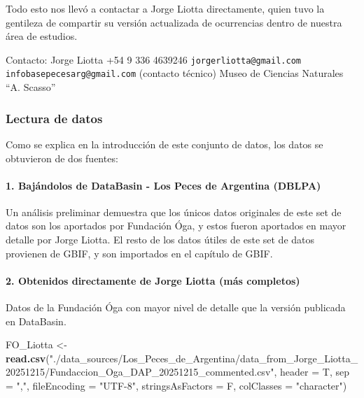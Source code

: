 \documentclass[sn-apa,pdflatex]{sn-jnl}
\newenvironment{Shaded}{\begin{snugshade}}{\end{snugshade}}
\newcommand{\AttributeTok}[1]{\textcolor[rgb]{0.13,0.29,0.53}{#1}}
\newcommand{\FunctionTok}[1]{\textcolor[rgb]{0.13,0.29,0.53}{\textbf{#1}}}
\newcommand{\NormalTok}[1]{#1}
\newcommand{\OtherTok}[1]{\textcolor[rgb]{0.56,0.35,0.01}{#1}}
\newcommand{\StringTok}[1]{\textcolor[rgb]{0.31,0.60,0.02}{#1}}
\begin{document}
Todo esto nos llevó a contactar a Jorge Liotta directamente, quien tuvo
la gentileza de compartir su versión actualizada de ocurrencias dentro
de nuestra área de estudios.

Contacto: Jorge Liotta +54 9 336 4639246 \texttt{jorgerliotta@gmail.com}
\texttt{infobasepecesarg@gmail.com} (contacto técnico) Museo de Ciencias
Naturales ``A. Scasso''

\subsubsection{Lectura de datos}\label{lectura-de-datos-7}

Como se explica en la introducción de este conjunto de datos, los datos
se obtuvieron de dos fuentes:

\paragraph{1. Bajándolos de DataBasin - Los Peces de Argentina
(DBLPA)}\label{bajuxe1ndolos-de-databasin---los-peces-de-argentina-dblpa}

Un análisis preliminar demuestra que los únicos datos originales de este
set de datos son los aportados por Fundación Óga, y estos fueron
aportados en mayor detalle por Jorge Liotta. El resto de los datos
útiles de este set de datos provienen de GBIF, y son importados en el
capítulo de GBIF.

\paragraph{2. Obtenidos directamente de Jorge Liotta (más
completos)}\label{obtenidos-directamente-de-jorge-liotta-muxe1s-completos}

Datos de la Fundación Óga con mayor nivel de detalle que la versión
publicada en DataBasin.

\begin{Shaded}
\begin{Highlighting}[]
\NormalTok{FO\_Liotta }\OtherTok{\textless{}{-}} \FunctionTok{read.csv}\NormalTok{(}\StringTok{"./data\_sources/Los\_Peces\_de\_Argentina/data\_from\_Jorge\_Liotta\_20251215/Fundaccion\_Oga\_DAP\_20251215\_commented.csv"}\NormalTok{,}
    \AttributeTok{header =}\NormalTok{ T, }\AttributeTok{sep =} \StringTok{","}\NormalTok{, }\AttributeTok{fileEncoding =} \StringTok{"UTF{-}8"}\NormalTok{, }\AttributeTok{stringsAsFactors =}\NormalTok{ F,}
    \AttributeTok{colClasses =} \StringTok{"character"}\NormalTok{)}
\end{Highlighting}
\end{Shaded}
\end{document}
